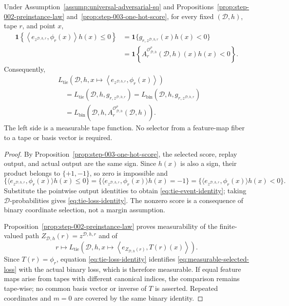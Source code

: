 \begin{proposition}
\label{prop:step-003-tie-free-transfer}
Under Assumption~\ref{assump:universal-adversarial-sq} and
Propositions~\ref{prop:step-002-preinstance-law}
and~\ref{prop:step-003-one-hot-score}, for every fixed
\((\mathcal D,h)\), tape \(r\), and point \(x\),
\[
\begin{aligned}
\mathbf 1\!\left\{
\left\langle e_{z^{\mathcal D,h,r}},\phi_r(x)\right\rangle h(x)\le0
\right\}
&=\mathbf 1\{g_{r,z^{\mathcal D,h,r}}(x)h(x)<0\}\\
&=\mathbf 1\!\left\{
A_r^{\mathcal O^\rho_{\mathcal D,h}}(\mathcal D,h)(x)h(x)<0
\right\}.
\end{aligned}
\tag{A.29}\label{eq:tie-event-identity}
\]
Consequently,
\[
\begin{aligned}
&L_{\mathrm{tie}}\!\left(
\mathcal D,h,
x\mapsto\left\langle e_{z^{\mathcal D,h,r}},\phi_r(x)\right\rangle
\right)\\
&\quad=L_{\mathrm{tie}}(\mathcal D,h,g_{r,z^{\mathcal D,h,r}})
=L_{\mathrm{bin}}(\mathcal D,h,g_{r,z^{\mathcal D,h,r}})\\
&\quad=L_{\mathrm{bin}}\!\left(
\mathcal D,h,A_r^{\mathcal O^\rho_{\mathcal D,h}}(\mathcal D,h)
\right).
\end{aligned}
\tag{A.30}\label{eq:tie-loss-identity}
\]
The left side is a measurable tape function.  No selector from a feature-map
fiber to a tape or basis vector is required.
\end{proposition}

\begin{proof}
By Proposition~\ref{prop:step-003-one-hot-score}, the selected score, replay
output, and actual output are the same sign.  Since \(h(x)\) is also a sign,
their product belongs to \(\{+1,-1\}\), so zero is impossible and
\[
\{\langle e_{z^{\mathcal D,h,r}},\phi_r(x)\rangle h(x)\le0\}
=\{\langle e_{z^{\mathcal D,h,r}},\phi_r(x)\rangle h(x)=-1\}
=\{\langle e_{z^{\mathcal D,h,r}},\phi_r(x)\rangle h(x)<0\}.
\tag{A.31}\label{eq:no-tie-event}
\]
Substitute the pointwise output identities to obtain
\eqref{eq:tie-event-identity}; taking \(\mathcal D\)-probabilities gives
\eqref{eq:tie-loss-identity}.  The nonzero score is a consequence of binary
coordinate selection, not a margin assumption.

Proposition~\ref{prop:step-002-preinstance-law} proves measurability of the
finite-valued path \(Z_{\mathcal D,h}(r)=z^{\mathcal D,h,r}\) and of
\[
r\longmapsto L_{\mathrm{tie}}\!\left(
\mathcal D,h,
x\mapsto\left\langle e_{Z_{\mathcal D,h}(r)},T(r)(x)\right\rangle
\right).
\tag{A.32}\label{eq:measurable-selected-loss}
\]
Since \(T(r)=\phi_r\), equation \eqref{eq:tie-loss-identity} identifies
\eqref{eq:measurable-selected-loss} with the actual binary loss, which is
therefore measurable.  If equal feature maps arise from tapes with different
canonical indices, the comparison remains tape-wise; no common basis vector
or inverse of \(T\) is asserted.  Repeated coordinates and \(m=0\) are
covered by the same binary identity.
\end{proof}

